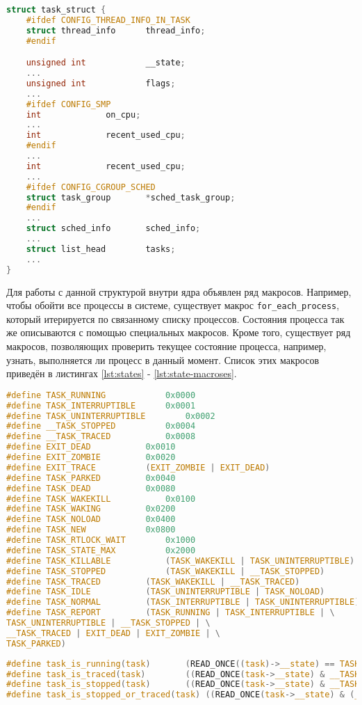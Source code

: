 \begin{lstlisting}[label=lst:task-struct, caption=Листинг структуры task\_struct с наиболее интересными полями, language=c]
struct task_struct {
	#ifdef CONFIG_THREAD_INFO_IN_TASK
	struct thread_info		thread_info;
	#endif

	unsigned int			__state;
	...
	unsigned int			flags;
	...
	#ifdef CONFIG_SMP
	int				on_cpu;
	...
	int				recent_used_cpu;
	#endif
	...
	int				recent_used_cpu;
	...
	#ifdef CONFIG_CGROUP_SCHED
	struct task_group		*sched_task_group;
	#endif
	...
	struct sched_info		sched_info;
	...
	struct list_head		tasks;
	...
}
\end{lstlisting}

Для работы с данной структурой внутри ядра объявлен ряд макросов. Например, чтобы обойти все процессы в системе, существует макрос \texttt{for\_each\_process}, который итерируется по связанному списку процессов. Состояния процесса так же описываются с помощью специальных макросов. Кроме того, существует ряд макросов, позволяющих проверить текущее состояние процесса, например, узнать, выполняется ли процесс в данный момент. Список этих макросов приведён в листингах \ref{lst:states} - \ref{lst:state-macroses}.\\

\begin{lstlisting}[label=lst:states, caption=Описание состояний процесса с помощью макросов, language=c]
#define TASK_RUNNING			0x0000
#define TASK_INTERRUPTIBLE		0x0001
#define TASK_UNINTERRUPTIBLE		0x0002
#define __TASK_STOPPED			0x0004
#define __TASK_TRACED			0x0008
#define EXIT_DEAD			0x0010
#define EXIT_ZOMBIE			0x0020
#define EXIT_TRACE			(EXIT_ZOMBIE | EXIT_DEAD)
#define TASK_PARKED			0x0040
#define TASK_DEAD			0x0080
#define TASK_WAKEKILL			0x0100
#define TASK_WAKING			0x0200
#define TASK_NOLOAD			0x0400
#define TASK_NEW			0x0800
#define TASK_RTLOCK_WAIT		0x1000
#define TASK_STATE_MAX			0x2000
#define TASK_KILLABLE			(TASK_WAKEKILL | TASK_UNINTERRUPTIBLE)
#define TASK_STOPPED			(TASK_WAKEKILL | __TASK_STOPPED)
#define TASK_TRACED			(TASK_WAKEKILL | __TASK_TRACED)
#define TASK_IDLE			(TASK_UNINTERRUPTIBLE | TASK_NOLOAD)
#define TASK_NORMAL			(TASK_INTERRUPTIBLE | TASK_UNINTERRUPTIBLE)
#define TASK_REPORT			(TASK_RUNNING | TASK_INTERRUPTIBLE | \
TASK_UNINTERRUPTIBLE | __TASK_STOPPED | \
__TASK_TRACED | EXIT_DEAD | EXIT_ZOMBIE | \
TASK_PARKED)
\end{lstlisting}

\begin{lstlisting}[label=lst:state-macroses, caption=Макросы\, с помощью которых можно узнать текущее состояние процесса, language=c]
#define task_is_running(task)		(READ_ONCE((task)->__state) == TASK_RUNNING)
#define task_is_traced(task)		((READ_ONCE(task->__state) & __TASK_TRACED) != 0)
#define task_is_stopped(task)		((READ_ONCE(task->__state) & __TASK_STOPPED) != 0)
#define task_is_stopped_or_traced(task)	((READ_ONCE(task->__state) & (__TASK_STOPPED | __TASK_TRACED)) != 0)
\end{lstlisting}

